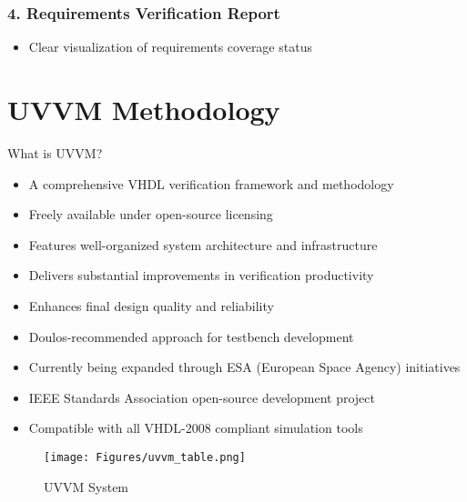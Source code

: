 \documentclass{article}
\begin{document}
\subsubsection*{4. Requirements Verification Report}
\begin{itemize}
    \item Clear visualization of requirements coverage status
\end{itemize}

\section*{UVVM Methodology}
What is UVVM?
\begin{itemize}
    \item A comprehensive VHDL verification framework and methodology
    \item Freely available under open-source licensing
    \item Features well-organized system architecture and infrastructure
    \item Delivers substantial improvements in verification productivity
    \item Enhances final design quality and reliability
    \item Doulos-recommended approach for testbench development
    \item Currently being expanded through ESA (European Space Agency) initiatives
    \item IEEE Standards Association open-source development project
    \item Compatible with all VHDL-2008 compliant simulation tools
\end{itemize}

\begin{figure}
    \centering
    \texttt{[image: Figures/uvvm\_table.png]}
    \caption{UVVM System}
    \label{fig:enter-label}
\end{figure}
\end{document}
